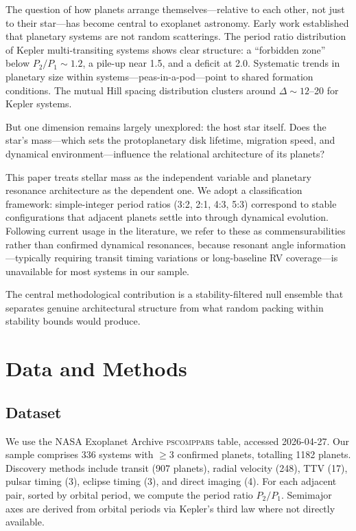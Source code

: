 \documentclass[twocolumn,usenatbib]{mnras}
\begin{document}
The question of how planets arrange themselves---relative to each other, not
just to their star---has become central to exoplanet astronomy. Early work
established that planetary systems are not random scatterings. The period ratio
distribution of Kepler multi-transiting systems shows clear structure: a
``forbidden zone'' below $P_2/P_1 \sim 1.2$, a pile-up near 1.5, and a deficit
at 2.0\citep{fabrycky2014,fang_margot_2012}. Systematic trends in planetary
size within systems---peas-in-a-pod---point to shared formation
conditions\citep{weiss2018,millholland2021}. The mutual Hill spacing
distribution clusters around $\Delta \sim 12$--20 for Kepler
systems\citep{puwu2015,fang_margot_2013}.

But one dimension remains largely unexplored: the host star itself. Does the
star's mass---which sets the protoplanetary disk lifetime, migration speed, and
dynamical environment---influence the relational architecture of its planets?

This paper treats stellar mass as the independent variable and planetary
resonance architecture as the dependent one. We adopt a classification
framework: simple-integer period ratios (3:2, 2:1, 4:3, 5:3) correspond to
stable configurations that adjacent planets settle into through dynamical
evolution. Following current usage in the literature\citep{mills2016,luger2017},
we refer to these as commensurabilities rather than confirmed dynamical
resonances, because resonant angle information---typically requiring transit
timing variations or long-baseline RV coverage---is unavailable for most systems
in our sample.

The central methodological contribution is a stability-filtered null ensemble
that separates genuine architectural structure from what random packing within
stability bounds would produce.

\section{Data and Methods}
\label{sec:methods}

\subsection{Dataset}

We use the NASA Exoplanet Archive \textsc{pscomppars} table, accessed
2026-04-27. Our sample comprises 336 systems with $\geq 3$ confirmed planets,
totalling 1182 planets. Discovery methods include transit (907 planets),
radial velocity (248), TTV (17), pulsar timing (3), eclipse timing (3), and
direct imaging (4). For each adjacent pair, sorted by orbital period, we
compute the period ratio $P_2/P_1$. Semimajor axes are derived from orbital
periods via Kepler's third law where not directly available.
\end{document}
